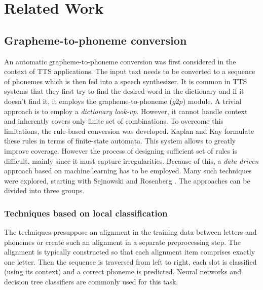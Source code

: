 \section{Related Work}
\label{relatedwork}
\subsection{Grapheme-to-phoneme conversion}
An automatic grapheme-to-phoneme conversion was first considered in the context of TTS applications. The input text needs to be converted to a sequence of phonemes which is then fed into a speech synthesizer.
It is common in TTS systems that they first try to find the desired word in the dictionary and if it doesn't find it, it employs the grapheme-to-phoneme ($g2p$) module.
A trivial approach is to employ a \textit{dictionary look-up}.
However, it cannot handle context and inherently covers only finite set of combinations.
To overcome this limitations, the rule-based conversion was developed.
Kaplan and Kay \cite{kaplan1994regular} formulate these rules in terms of finite-state automata.
This system allows to greatly improve coverage.
However the process of designing sufficient set of rules is difficult, mainly since it must capture irregularities.
Because of this, a \textit{data-driven} approach based on machine learning has to be employed.
Many such techniques were explored, starting with Sejnowski and Rosenberg \cite{sejnowski1988nettalk}.
The approaches can be divided into three groups.
\subsubsection{Techniques based on local classification}
The techniques presuppose an alignment in the training data between letters and phonemes or create such an alignment in a separate preprocessing step.
The alignment is typically constructed so that each alignment item comprises exactly one letter.
Then the sequence is traversed from left to right, each slot is classified (using its context) and a correct phoneme is predicted.
Neural networks and decision tree classifiers are commonly used for this task.
